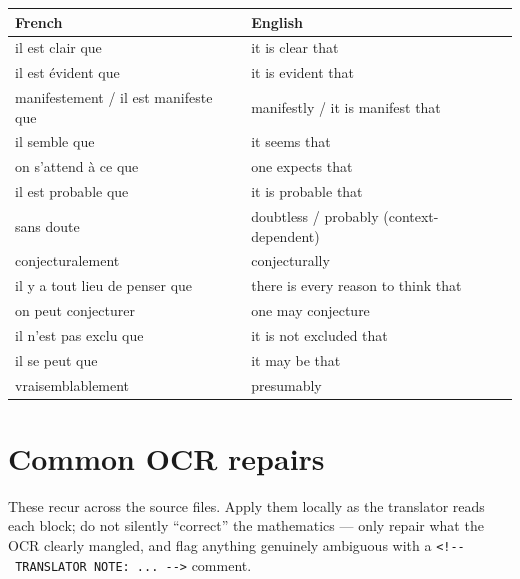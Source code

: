 \documentclass[
  11pt,
  a4paper,
]{book}
\newcounter{none} %
\begin{document}
{\def\LTcaptype{none} %
\begin{longtable}[]{@{}
  >{\raggedright\arraybackslash}p{}
  >{\raggedright\arraybackslash}p{}@{}}
\toprule\noalign{}
\begin{minipage}[b]{\linewidth}\raggedright
French
\end{minipage} & \begin{minipage}[b]{\linewidth}\raggedright
English
\end{minipage} \\
\midrule\noalign{}
\endhead
\bottomrule\noalign{}
\endlastfoot
il est clair que & it is clear that \\
il est évident que & it is evident that \\
manifestement / il est manifeste que & manifestly / it is manifest
that \\
il semble que & it seems that \\
on s'attend à ce que & one expects that \\
il est probable que & it is probable that \\
sans doute & doubtless / probably (context-dependent) \\
conjecturalement & conjecturally \\
il y a tout lieu de penser que & there is every reason to think that \\
on peut conjecturer & one may conjecture \\
il n'est pas exclu que & it is not excluded that \\
il se peut que & it may be that \\
vraisemblablement & presumably \\
\end{longtable}
}

\section{Common OCR repairs}\label{common-ocr-repairs}

These recur across the source files. Apply them locally as the
translator reads each block; do not silently ``correct'' the mathematics
--- only repair what the OCR clearly mangled, and flag anything
genuinely ambiguous with a
\texttt{\textless{}!-\/-\ TRANSLATOR\ NOTE:\ ...\ -\/-\textgreater{}}
comment.
\end{document}
